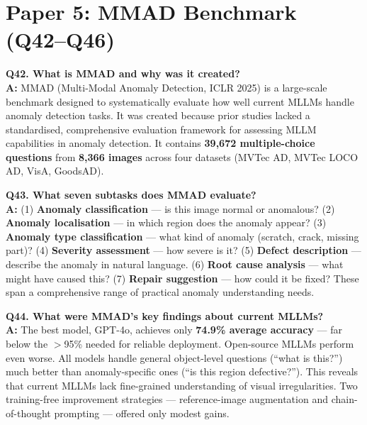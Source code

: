 \documentclass[12pt, a4paper]{article}
\begin{document}
\section{Paper 5: MMAD Benchmark (Q42--Q46)}

\begin{qa}
\textbf{Q42. What is MMAD and why was it created?}\\[4pt]
\textbf{A:} MMAD (Multi-Modal Anomaly Detection, ICLR 2025) is a large-scale benchmark designed to systematically evaluate how well current MLLMs handle anomaly detection tasks. It was created because prior studies lacked a standardised, comprehensive evaluation framework for assessing MLLM capabilities in anomaly detection. It contains \textbf{39,672 multiple-choice questions} from \textbf{8,366 images} across four datasets (MVTec AD, MVTec LOCO AD, VisA, GoodsAD).
\end{qa}

\begin{qa}
\textbf{Q43. What seven subtasks does MMAD evaluate?}\\[4pt]
\textbf{A:} (1) \textbf{Anomaly classification} --- is this image normal or anomalous? (2) \textbf{Anomaly localisation} --- in which region does the anomaly appear? (3) \textbf{Anomaly type classification} --- what kind of anomaly (scratch, crack, missing part)? (4) \textbf{Severity assessment} --- how severe is it? (5) \textbf{Defect description} --- describe the anomaly in natural language. (6) \textbf{Root cause analysis} --- what might have caused this? (7) \textbf{Repair suggestion} --- how could it be fixed? These span a comprehensive range of practical anomaly understanding needs.
\end{qa}

\begin{qa}
\textbf{Q44. What were MMAD's key findings about current MLLMs?}\\[4pt]
\textbf{A:} The best model, GPT-4o, achieves only \textbf{74.9\% average accuracy} --- far below the $>$95\% needed for reliable deployment. Open-source MLLMs perform even worse. All models handle general object-level questions (``what is this?'') much better than anomaly-specific ones (``is this region defective?''). This reveals that current MLLMs lack fine-grained understanding of visual irregularities. Two training-free improvement strategies --- reference-image augmentation and chain-of-thought prompting --- offered only modest gains.
\end{qa}
\end{document}
